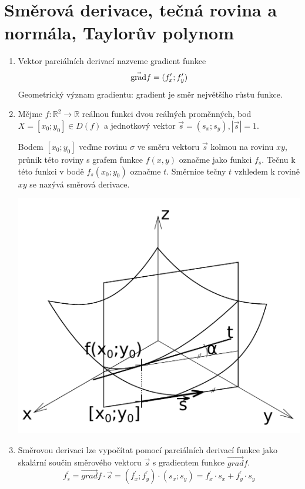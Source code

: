 \section{Směrová derivace, tečná rovina a normála, Taylorův polynom}
\begin{enumerate}

\item Vektor parciálních derivací nazveme gradient funkce
$$
\vec{\operatorname{grad}}f = (f^\prime_x; f^\prime_y)
$$
Geometrický význam gradientu: gradient je směr největšího růstu funkce.


\item Mějme $f:\mathbb{R}^2 \to \mathbb{R}$ reálnou funkci dvou reálných proměnných, bod $X = [x_0;y_0] \in D(f)$ a jednotkový vektor $\vec{s} = (s_x;s_y), |\vec{s}|=1$.

Bodem $[x_0;y_0]$ veďme rovinu $\sigma$ ve směru vektoru $\vec{s}$ kolmou na rovinu $xy$, průnik této roviny s grafem funkce $f(x,y)$ označme jako funkci $f_s$. Tečnu k této funkci v bodě $f_s(x_0;y_0)$ označme $t$. Směrnice tečny $t$ vzhledem k rovině $xy$ se nazývá směrová derivace.

\includegraphics[scale=0.5]{Obrazky/SmerDer.pdf}

\item Směrovou derivaci lze vypočítat pomocí parciálních derivací funkce jako skalární součin směrového vektoru $\vec{s}$ s gradientem funkce $\vec{grad}f$. 
$$
f^\prime_s = \vec{grad}f \cdot \vec{s} 
           = (f^\prime_x; f^\prime_y) \cdot (s_x;s_y)
           = f^\prime_x \cdot s_x + f^\prime_y \cdot s_y
$$


\end{enumerate}
